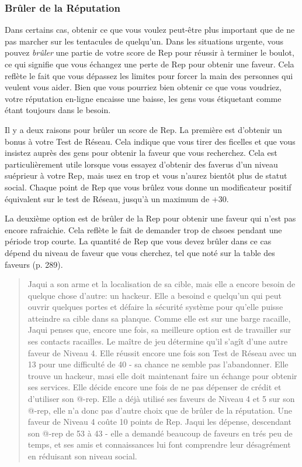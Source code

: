 \subsubsection{Brûler de la Réputation} 

Dans certains cas, obtenir ce que vous voulez peut-être plus important que de ne pas marcher sur les tentacules de quelqu'un. Dans les situations urgente, vous pouvez \textit{brûler} une partie de votre score de Rep pour réussir à terminer le boulot, ce qui signifie que vous échangez une perte de Rep pour obtenir une faveur. Cela reflète le fait que vous dépassez les limites pour forcer la main des personnes qui veulent vous aider. Bien que vous pourriez bien obtenir ce que vous voudriez, votre réputation en-ligne encaisse une baisse, les gens vous étiquetant comme étant toujours dans le besoin. 

Il y a deux raisons pour brûler un score de Rep. La première est d'obtenir un bonus à votre Test de Réseau. Cela indique que vous tirer des ficelles et que vous insistez auprès des gens pour obtenir la faveur que vous recherchez. Cela est particulièrement utile lorsque vous essayez d'obtenir des faverus d'un niveau suéprieur à votre Rep, mais usez en trop et vous n'aurez bientôt plus de statut social. Chaque point de Rep que vous brûlez vous donne un modificateur positif équivalent sur le test de Réseau, jusqu'à un maximum de +30. 

La deuxième option est de brûler de la Rep pour obtenir une faveur qui n'est pas encore rafraichie. Cela reflète le fait de demander trop de chsoes pendant une période trop courte. La quantité de Rep que vous devez brûler dans ce cas dépend du niveau de faveur que vous cherchez, tel que noté sur la table des faveurs (p. 289). 

\begin{quotation} Jaqui a son arme et la localisation de sa cible, mais elle a encore besoin de quelque chose d'autre: un hackeur. Elle a besoind e quelqu'un qui peut ouvrir quelques portes et défaire la sécurité système pour qu'elle puisse atteindre sa cible dans sa planque. Comme elle est sur une barge racaille, Jaqui penses que, encore une fois, sa meilleure option est de travailler sur ses contacts racailles. Le maître de jeu détermine qu'il s'agît d'une autre faveur de Niveau 4. Elle réussit encore une fois son Test de Réseau avec un 13 pour une difficulté de 40 - sa chance ne semble pas l'abandonner. Elle trouve un hackeur, masi elle doit maintenant faire un échange pour obtenir ses services. Elle décide encore une fois de ne pas dépenser de crédit et d'utiliser son @-rep. Elle a déjà utilisé ses faveurs de Niveau 4 et 5 sur son @-rep, elle n'a donc pas d'autre choix que de brûler de la réputation. Une faveur de Niveau 4 coûte 10 points de Rep. Jaqui les dépense, descendant son @-rep de 53 à 43 - elle a demandé beaucoup de faveurs en trés peu de temps, et ses amis et connaissances lui font comprendre leur désagrément en réduisant son niveau social. \end{quotation} 

